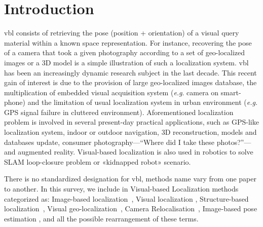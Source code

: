 \section{Introduction}
\label{sec:introduction}

		\Ac{vbl} consists of retrieving the pose (position + orientation) of a visual query material within a known space representation. For instance, recovering the pose of a camera that took a given photography according to a set of geo-localized images or a 3D model is a simple illustration of such a localization system. \ac{vbl} has been an increasingly dynamic research subject in the last decade. This recent gain of interest is due to the provision of large geo-localized images database, the multiplication of embedded visual acquisition system (\textit{e.g}. camera on smart-phone) and the limitation of usual localization system in urban environment (\textit{e.g.} GPS signal failure in cluttered environment). Aforementioned localization problem is involved in several present-day practical applications, such as GPS-like localization system, indoor or outdoor navigation, 3D reconstruction, models and databases update, consumer photography---``Where did I take these photos?''---and augmented reality. Visual-based localization is also used in robotics to solve SLAM loop-closure problem or «kidnapped robot» scenario.
		
		There is no standardized designation for \ac{vbl}, methods name vary from one paper to another. In this survey, we include in Visual-based Localization methods categorized as: Image-based localization~\citep{Azzi2016}, Visual localization \cite{Torii2011}, Structure-based localization~\citep{Sattler2015}, Visual geo-localization~\citep{Zamir2016,Brejcha2017}, Camera Relocalisation~\citep{Shotton2013}, Image-based pose estimation \citep{Heisterklaus2014}, and all the possible rearrangement of these terms.

	
	
